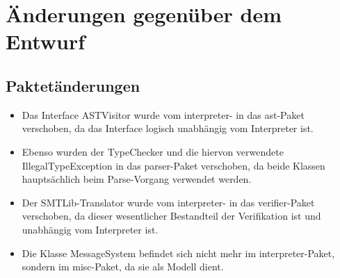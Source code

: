 \section{\"{A}nderungen gegen\"{u}ber dem Entwurf}

\subsection{Paktet\"{a}nderungen}
\begin{itemize}
  \item Das Interface ASTVisitor wurde vom interpreter- in das ast-Paket verschoben, da das Interface logisch unabh\"{a}ngig vom Interpreter ist.
  \item Ebenso wurden der TypeChecker und die hiervon verwendete IllegalTypeException in das parser-Paket verschoben, da beide Klassen haupts\"{a}chlich beim Parse-Vorgang verwendet werden.
  \item Der SMTLib-Translator wurde vom interpreter- in das verifier-Paket verschoben, da dieser wesentlicher Bestandteil der Verifikation ist und unabh\"{a}ngig vom Interpreter ist.
  \item Die Klasse MessageSystem befindet sich nicht mehr im interpreter-Paket, sondern im misc-Paket, da sie als Modell dient.
\end{itemize}

